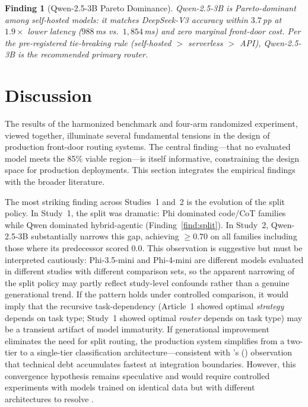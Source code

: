 \documentclass{article}
\newtheorem{finding}{Finding}
\begin{document}
\begin{finding}[Qwen-2.5-3B Pareto Dominance]
\label{find:qwen-pareto}
\emph{Qwen-2.5-3B is Pareto-dominant among self-hosted models: it matches DeepSeek-V3 accuracy within $3.7$\,pp at $1.9\times$ lower latency ($988$\,ms vs.\ $1{,}854$\,ms) and zero marginal front-door cost. Per the pre-registered tie-breaking rule (self-hosted $>$ serverless $>$ API), Qwen-2.5-3B is the recommended primary router.}
\end{finding}

\section{Discussion}
\label{sec:discussion}

The results of the harmonized benchmark and four-arm randomized experiment, viewed together, illuminate several fundamental tensions in the design of production front-door routing systems. The central finding---that no evaluated model meets the 85\% viable region---is itself informative, constraining the design space for production deployments. This section integrates the empirical findings with the broader literature.

The most striking finding across Studies~1 and~2 is the evolution of the split policy. In Study~1, the split was dramatic: Phi dominated code/CoT families while Qwen dominated hybrid-agentic (Finding~\ref{find:split}). In Study~2, Qwen-2.5-3B substantially narrows this gap, achieving $\geq 0.70$ on all families including those where its predecessor scored 0.0. This observation is suggestive but must be interpreted cautiously: Phi-3.5-mini and Phi-4-mini are different models evaluated in different studies with different comparison sets, so the apparent narrowing of the split policy may partly reflect study-level confounds rather than a genuine generational trend. If the pattern holds under controlled comparison, it would imply that the recursive task-dependency (Article~1 showed optimal \emph{strategy} depends on task type; Study~1 showed optimal \emph{router} depends on task type) may be a transient artifact of model immaturity. If generational improvement eliminates the need for split routing, the production system simplifies from a two-tier to a single-tier classification architecture---consistent with \citeauthor{sculley2015debt}'s (\citeyear{sculley2015debt}) observation that technical debt accumulates fastest at integration boundaries. However, this convergence hypothesis remains speculative and would require controlled experiments with models trained on identical data but with different architectures to resolve \citep{mukherjee2023orca,mitra2023orca2}.
\end{document}
